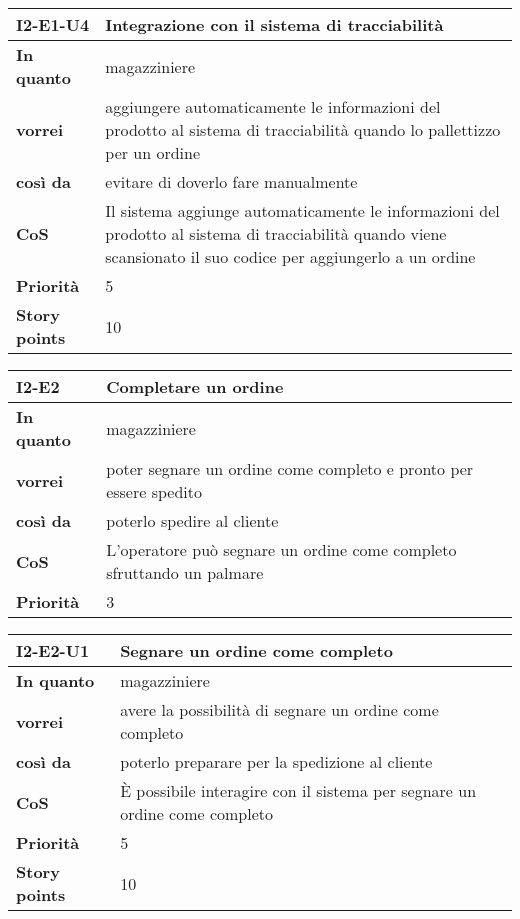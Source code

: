 \begin{table}[H]
  \begin{tabularx}{\textwidth}{lX}
    \toprule
    \textbf{I2-E1-U4} & \textbf{Integrazione con il sistema di tracciabilità} \\
    \midrule
    \textbf{In quanto} & magazziniere \\
    \textbf{vorrei} & aggiungere automaticamente le informazioni del prodotto al sistema di tracciabilità quando lo pallettizzo per un ordine \\
    \textbf{così da} & evitare di doverlo fare manualmente \\
    \midrule
    \textbf{CoS} & Il sistema aggiunge automaticamente le informazioni del prodotto al sistema di tracciabilità quando viene scansionato il suo codice per aggiungerlo a un ordine \\
    \midrule
    \textbf{Priorità} & 5 \\
    \textbf{Story points} & 10 \\
    \bottomrule
  \end{tabularx}
  \label{user-story:i2-e1-u4}
\end{table}

\begin{table}[H]
  \begin{tabularx}{\textwidth}{lX}
    \toprule
    \textbf{I2-E2} & \textbf{Completare un ordine} \\
    \midrule
    \textbf{In quanto} & magazziniere \\
    \textbf{vorrei} & poter segnare un ordine come completo e pronto per essere spedito \\
    \textbf{così da} & poterlo spedire al cliente \\
    \midrule
    \textbf{CoS} & L'operatore può segnare un ordine come completo sfruttando un palmare \\
    \midrule
    \textbf{Priorità} & 3 \\
    \bottomrule
  \end{tabularx}
  \label{user-story:i2-e2}
\end{table}

\begin{table}[H]
  \begin{tabularx}{\textwidth}{lX}
    \toprule
    \textbf{I2-E2-U1} & \textbf{Segnare un ordine come completo} \\
    \midrule
    \textbf{In quanto} & magazziniere \\
    \textbf{vorrei} & avere la possibilità di segnare un ordine come completo \\
    \textbf{così da} & poterlo preparare per la spedizione al cliente \\
    \midrule
    \textbf{CoS} & È possibile interagire con il sistema per segnare un ordine come completo \\
    \midrule
    \textbf{Priorità} & 5 \\
    \textbf{Story points} & 10 \\
    \bottomrule
  \end{tabularx}
  \label{user-story:i2-e2-u1}
\end{table}

